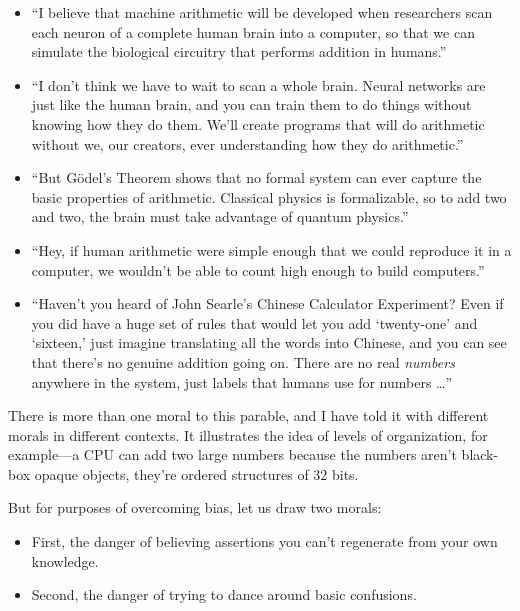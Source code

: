 \begin{itemize}
\item {
 ``I believe that machine arithmetic will be
developed when researchers scan each neuron of a complete human brain
into a computer, so that we can simulate the biological circuitry that
performs addition in humans.''}

\item {
 ``I don't think we have to wait
to scan a whole brain. Neural networks are just like the human brain,
and you can train them to do things without knowing how they do them.
We'll create programs that will do arithmetic without
we, our creators, ever understanding how they do
arithmetic.''}

\item {
 ``But Gödel's Theorem shows that
no formal system can ever capture the basic properties of arithmetic.
Classical physics is formalizable, so to add two and two, the brain
must take advantage of quantum physics.''}

\item {
 ``Hey, if human arithmetic were simple enough
that we could reproduce it in a computer, we wouldn't
be able to count high enough to build computers.''}

\item {
 ``Haven't you heard of John
Searle's Chinese Calculator Experiment? Even if you did
have a huge set of rules that would let you add
`twenty-one' and
`sixteen,' just imagine translating all
the words into Chinese, and you can see that there's no
genuine addition going on. There are no real \textit{numbers} anywhere
in the system, just labels that humans use for numbers
\ldots''}
\end{itemize}

{
 There is more than one moral to this parable, and I have told it
with different morals in different contexts. It illustrates the idea of
levels of organization, for example---a CPU can add two large numbers
because the numbers aren't black-box opaque objects,
they're ordered structures of 32 bits.}

{
 But for purposes of overcoming bias, let us draw two morals:}

\begin{itemize}
\item {
 First, the danger of believing assertions you
can't regenerate from your own knowledge.}

\item {
  Second, the danger of trying to dance around basic confusions.}
\end{itemize}

